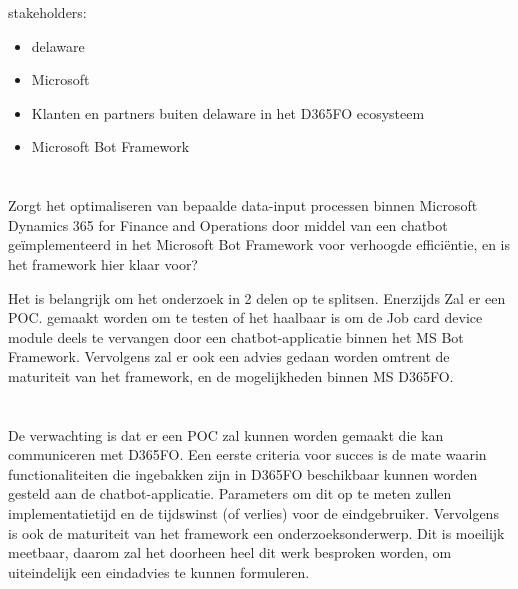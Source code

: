 stakeholders:
\begin{itemize}
    \item delaware
    \item Microsoft 
    \item Klanten en partners buiten delaware in het D365FO ecosysteem \item Microsoft Bot Framework
\end{itemize}

\section{}
\label{sec:onderzoeksvraag}
Zorgt het optimaliseren van bepaalde data-input processen binnen Microsoft Dynamics 365 for Finance and Operations door middel van een chatbot geïmplementeerd in het Microsoft Bot Framework voor verhoogde efficiëntie, en is het framework hier klaar voor? 


Het is belangrijk om het onderzoek in 2 delen op te splitsen. Enerzijds Zal er een POC. gemaakt worden om te testen of het haalbaar is om de Job card device module deels te vervangen door een chatbot-applicatie binnen het MS Bot Framework. Vervolgens zal er ook een advies gedaan worden omtrent de maturiteit van het framework, en de mogelijkheden binnen MS D365FO. 

\section{}
\label{sec:onderzoeksdoelstelling}

De verwachting is dat er een POC zal kunnen worden gemaakt die kan communiceren met D365FO. Een eerste criteria voor succes is de mate waarin functionaliteiten die ingebakken zijn in D365FO beschikbaar kunnen worden gesteld aan de chatbot-applicatie. Parameters om dit op te meten zullen implementatietijd en de tijdswinst (of verlies) voor de eindgebruiker. Vervolgens is ook de maturiteit van het framework een onderzoeksonderwerp. Dit is moeilijk meetbaar, daarom zal het doorheen heel dit werk besproken worden, om uiteindelijk een eindadvies te kunnen formuleren. 

